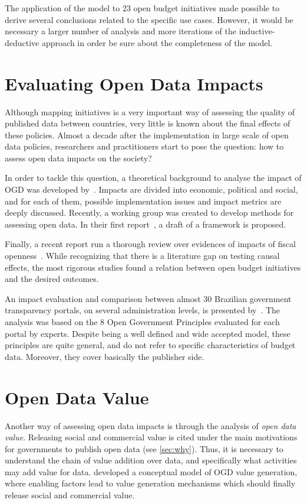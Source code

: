 The application of the model to 23 open budget initiatives made possible to derive several conclusions related to the specific use cases.
However, it would be necessary a larger number of analysis and more iterations of the inductive-deductive approach in order be sure about the completeness of the model.

\section{Evaluating Open Data Impacts}
\label{sec:impacts}

Although mapping initiatives is a very important way of assessing the quality of published data between countries, very little is known about the final effects of these policies.
Almost a decade after the implementation in large scale of open data policies, researchers and practitioners start to pose the question: how to assess open data impacts on the society?

In order to tackle this question, a theoretical background to analyse the impact of OGD was developed by~. 
Impacts are divided into economic, political and social, and for each of them, possible implementation issues and impact metrics are deeply discussed.
Recently, a working group was created to develop methods for assessing open data. In their first report~\cite{Caplan2014}, a draft of a framework is proposed.

Finally, a recent report run a thorough review over evidences of impacts of fiscal openness~\cite{Renzio2015}. While recognizing that there is a literature gap on testing causal effects, the most rigorous studies found a relation between open budget initiatives and the desired outcomes.

An impact evaluation and comparison between almost 30 Brazilian government transparency portals, on several administration levels, is presented by~. The analysis was based on the 8 Open Government Principles evaluated for each portal by experts. Despite being a well defined and wide accepted model, these principles are quite general, and do not refer to specific characteristics of budget data. Moreover, they cover basically the publisher side.


\section{Open Data Value}
\label{sec:value}

Another way of assessing open data impacts is through the analysis of \emph{open data value}.
Releasing social and commercial value is cited under the main motivations for governments to publish open data (see \autoref{sec:why}).
Thus, it is necessary to understand the chain of value addition over data, and specifically what activities may add value for data.
 developed a conceptual model of OGD value generation, where enabling factors lead to value generation mechanisms which should finally release social and commercial value. 

